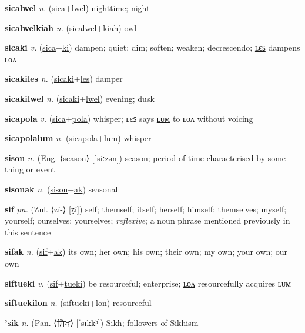 \textbf{\hypertarget{sicalwel}{sicalwel}} \textit{n.} (\hyperlink{sica}{sica}+\allowbreak \hyperlink{lwel}{lwel})
nighttime; night

\textbf{\hypertarget{sicalwelkiah}{sicalwelkiah}} \textit{n.} (\hyperlink{sicalwel}{sicalwel}+\allowbreak \hyperlink{kiah}{kiah})
owl

\textbf{\hypertarget{sicaki}{sicaki}} \textit{v.} (\hyperlink{sica}{sica}+\allowbreak \hyperlink{ki}{ki})
dampen; quiet; dim; soften; weaken; decrescendo; \hyperlink{sicakiles}{ʟєꜱ} dampens ʟᴏᴧ

\textbf{\hypertarget{sicakiles}{sicakiles}} \textit{n.} (\hyperlink{sicaki}{sicaki}+\allowbreak \hyperlink{les}{les})
damper

\textbf{\hypertarget{sicakilwel}{sicakilwel}} \textit{n.} (\hyperlink{sicaki}{sicaki}+\allowbreak \hyperlink{lwel}{lwel})
evening; dusk

\textbf{\hypertarget{sicapola}{sicapola}} \textit{v.} (\hyperlink{sica}{sica}+\allowbreak \hyperlink{pola}{pola})
whisper; ʟєꜱ says \hyperlink{sicapolalum}{ʟᴜᴍ} to ʟᴏᴧ without voicing

\textbf{\hypertarget{sicapolalum}{sicapolalum}} \textit{n.} (\hyperlink{sicapola}{sicapola}+\allowbreak \hyperlink{lum}{lum})
whisper

\textbf{\hypertarget{sison}{sison}} \textit{n.} (Eng. ⟨season⟩ [ˈsiːzən])
season; period of time characterised by some thing or event

\textbf{\hypertarget{sisonak}{sisonak}} \textit{n.} (\hyperlink{sison}{sison}+\allowbreak \hyperlink{ak}{ak})
seasonal

\textbf{\hypertarget{sif}{sif}} \textit{pn.} (Zul. ⟨zí-⟩ [z̤í])
self; themself; itself; herself; himself; themselves; myself; yourself; ourselves; yourselves; \textit{reflexive}; a noun phrase mentioned previously in this sentence

\textbf{\hypertarget{sifak}{sifak}} \textit{n.} (\hyperlink{sif}{sif}+\allowbreak \hyperlink{ak}{ak})
its own; her own; his own; their own; my own; your own; our own

\textbf{\hypertarget{siftueki}{siftueki}} \textit{v.} (\hyperlink{sif}{sif}+\allowbreak \hyperlink{tueki}{tueki})
be resourceful; enterprise; \hyperlink{siftuekilon}{ʟᴏᴧ} resourcefully acquires ʟᴜᴍ

\textbf{\hypertarget{siftuekilon}{siftuekilon}} \textit{n.} (\hyperlink{siftueki}{siftueki}+\allowbreak \hyperlink{lon}{lon})
resourceful

\textbf{\hypertarget{'sik}{'sik}} \textit{n.} (Pan. ⟨{\gurmukhi{}ਸਿੱਖ}⟩ [ˈsɪkkʰ])
Sikh; followers of Sikhism

